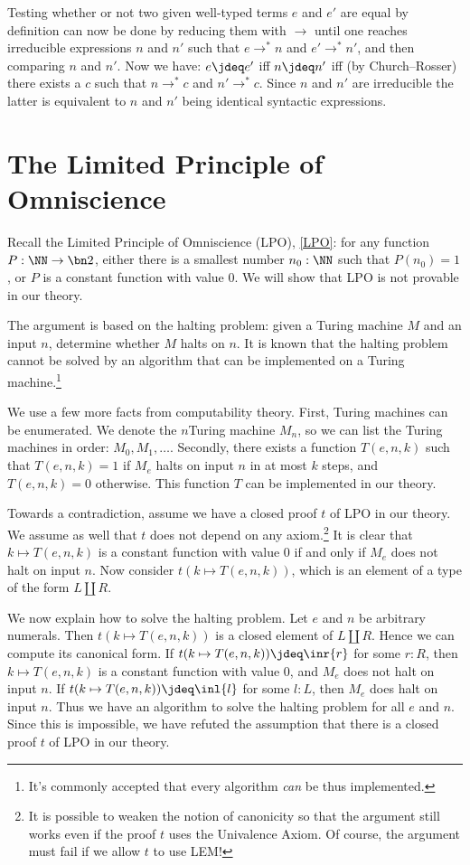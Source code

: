 Testing whether or not two given well-typed terms $e$ and $e'$ 
are equal by definition can now be done
by reducing them with $\to$ until one reaches irreducible expressions $n$ and $n'$
such that $e\to^* n$ and $e'\to^* n'$, and then comparing $n$ and $n'$. 
Now we have: $e\jdeq e'$ iff $n\jdeq n'$ iff (by Church--Rosser)
there exists a $c$ such that $n\to^* c$ and $n'\to^* c$.
Since $n$ and $n'$ are irreducible the latter is equivalent to
$n$ and $n'$ being identical syntactic expressions.

\section{The Limited Principle of Omniscience}
\label{sec:LPO}

\begin{remark}\label{rem:LPO-solves-halting problem}
Recall the Limited Principle of Omniscience (LPO), \cref{LPO}:
  for any function $P:\NN\to\bn 2$,
  either there is a smallest number $n_0:\NN$ such that $P(n_0)=1$,
  or $P$ is a constant function with value $0$.
We will show that LPO is not provable in our theory.

The argument is based on the halting problem: given a Turing machine
$M$ and an input $n$, determine whether $M$ halts on $n$.
It is known that the halting problem cannot be solved by an algorithm
that can be implemented on a Turing machine.\footnote{It's commonly accepted that
  every algorithm \emph{can} be thus implemented.}

We use a few more facts from computability theory.
First, Turing machines can be enumerated. We denote the $n$\th Turing machine $M_n$,
so we can list the Turing machines in order: $M_0,M_1,\ldots$.
Secondly, there exists a function $T(e,n,k)$ such that $T(e,n,k) = 1$
if $M_e$ halts on input $n$ in at most $k$ steps, and $T(e,n,k) = 0$
otherwise. This function $T$ can be implemented in our theory.

Towards a contradiction, assume we have a closed proof $t$ of LPO in our theory.
We assume as well that $t$ does not depend on any axiom.\footnote{It is possible to weaken the notion
  of canonicity so that the argument still works even if the proof $t$ uses the Univalence Axiom.
Of course, the argument must fail if we allow $t$ to use LEM!}
It is clear that $k\mapsto T(e,n,k)$ is a constant function with value $0$
if and only if $M_e$ does not halt on input $n$. Now consider $t(k\mapsto T(e,n,k))$,
which is an element of a type of the form $L\coprod R$.

We now explain how to solve the halting problem.
Let $e$ and $n$ be arbitrary numerals.
Then $t(k\mapsto T(e,n,k))$ is a closed element of $L\coprod R$.
Hence we can compute its canonical form. If $t(k\mapsto T(e,n,k))\jdeq\inr{r}$ for some
$r:R$, then $k\mapsto T(e,n,k)$ is a constant function with value $0$,
and $M_e$ does not halt on input $n$. If $t(k\mapsto T(e,n,k))\jdeq\inl{l}$ for some
$l:L$, then $M_e$ does halt on input $n$.
Thus we have an algorithm to solve the halting problem
for all $e$ and $n$. Since this is impossible, we have refuted the assumption
that there is a closed proof $t$ of LPO in our theory.
\end{remark}

